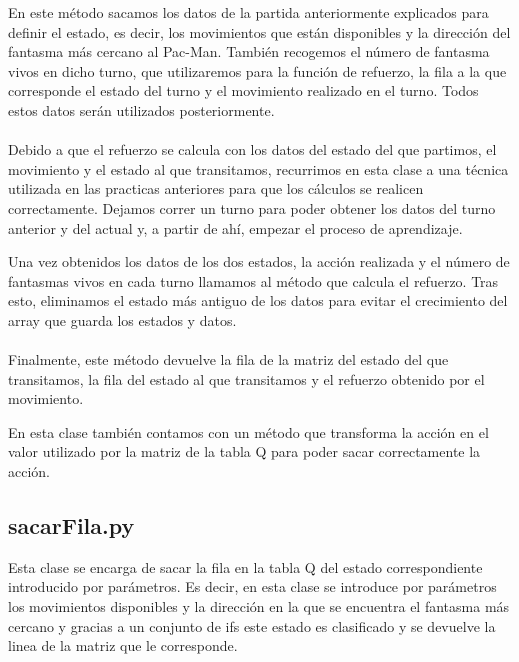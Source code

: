 \documentclass[11pt,a4paper]{article}
\begin{document}
En este método sacamos los datos de la partida anteriormente explicados para definir el estado, es decir, los movimientos que están disponibles y la dirección del fantasma más cercano al Pac-Man. También recogemos el número de fantasma vivos en dicho turno, que utilizaremos para la función de refuerzo, la fila a la que corresponde el estado del turno y el movimiento realizado en el turno. Todos estos datos serán utilizados posteriormente.

\paragraph{}
Debido a que el refuerzo se calcula con los datos del estado del que partimos, el movimiento y el estado al que transitamos, recurrimos en esta clase a una técnica utilizada en las practicas anteriores para que los cálculos se realicen correctamente. Dejamos correr un turno para poder obtener los datos del turno anterior y del actual y, a partir de ahí, empezar el proceso de aprendizaje.

Una vez obtenidos los datos de los dos estados, la acción realizada y el número de fantasmas vivos en cada turno llamamos al método que calcula el refuerzo. Tras esto, eliminamos el estado más antiguo de los datos para evitar el crecimiento del array que guarda los estados y datos.

\paragraph{}

Finalmente, este método devuelve la fila de la matriz del estado del que transitamos, la fila del estado al que transitamos y el refuerzo obtenido por el movimiento.

En esta clase también contamos con un método que transforma la acción en el valor utilizado por la matriz de la tabla Q para poder sacar correctamente la acción.

\subsection{sacarFila.py}

Esta clase se encarga de sacar la fila en la tabla Q del estado correspondiente introducido por parámetros. Es decir, en esta clase se introduce por parámetros los movimientos disponibles y la dirección en la que se encuentra el fantasma más cercano y gracias a un conjunto de ifs este estado es clasificado y se devuelve la linea de la matriz que le corresponde.
\end{document}
